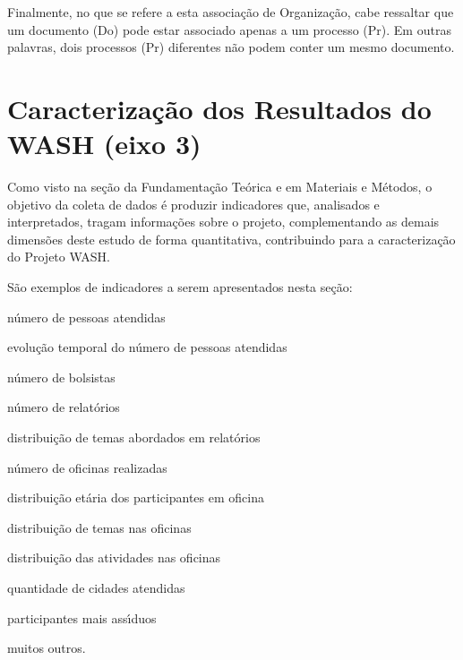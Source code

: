 \documentclass[
12pt,		%
openright,	%
twoside,  %
a4paper,			%
chapter=TITLE,		%
english,			%
french,				%
spanish,			%
brazil				%
]{USPSC-classe/USPSC}
\begin{document}
Finalmente, no que se refere a esta associa\c{c}\~ao de \textquotedbl Organiza\c{c}\~ao\textquotedbl , cabe ressaltar que um documento (Do) pode estar associado apenas a um processo (Pr). Em outras palavras, dois processos (Pr) diferentes n\~ao podem conter um mesmo documento.










\section[Caracteriza\c{c}\~ao dos Resultados do WASH (eixo 3)]{Caracteriza\c{c}\~ao dos Resultados do WASH (eixo 3)}\label{Caracteriza\c{c}\~ao dos Resultados do WASH (eixo 3)}
Como visto na se\c{c}\~ao da Fundamenta\c{c}\~ao Te\'orica e em Materiais e M\'etodos, o objetivo da coleta de dados \'e produzir indicadores que, analisados e interpretados, tragam informa\c{c}\~oes sobre o projeto, complementando as demais dimens\~oes deste estudo de forma quantitativa, contribuindo para a caracteriza\c{c}\~ao do Projeto WASH.










S\~ao exemplos de indicadores a serem apresentados nesta se\c{c}\~ao:











\begin{alineas}
\item n\'umero de pessoas atendidas
\item evolu\c{c}\~ao temporal do n\'umero de pessoas atendidas
\item n\'umero de bolsistas
\item n\'umero de relat\'orios
\item distribui\c{c}\~ao de temas abordados em relat\'orios
\item n\'umero de oficinas realizadas
\item distribui\c{c}\~ao et\'aria dos participantes em oficina
\item distribui\c{c}\~ao de temas nas oficinas
\item distribui\c{c}\~ao das atividades nas oficinas
\item quantidade de cidades atendidas
\item participantes mais ass\'{\i}duos
\item muitos outros.
\end{alineas}
\end{document}
